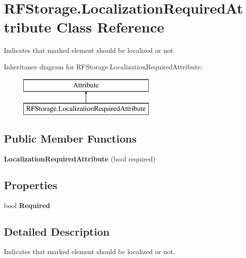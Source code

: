 \section{R\+F\+Storage.\+Localization\+Required\+Attribute Class Reference}
\label{class_r_f_storage_1_1_localization_required_attribute}


Indicates that marked element should be localized or not.  


Inheritance diagram for R\+F\+Storage.\+Localization\+Required\+Attribute\+:\begin{figure}[H]
\begin{center}
\leavevmode
\includegraphics[height=2.000000cm]{class_r_f_storage_1_1_localization_required_attribute}
\end{center}
\end{figure}
\subsection*{Public Member Functions}
\begin{DoxyCompactItemize}
\item 
\mbox{\label{class_r_f_storage_1_1_localization_required_attribute_ab5d889aa12df48310745f86a132b45fb}} 
{\bfseries Localization\+Required\+Attribute} (bool required)
\end{DoxyCompactItemize}
\subsection*{Properties}
\begin{DoxyCompactItemize}
\item 
\mbox{\label{class_r_f_storage_1_1_localization_required_attribute_aad1160151af5ec0bf170dfdd9c585f4c}} 
bool {\bfseries Required}\hspace{0.3cm}{\ttfamily  [get]}
\end{DoxyCompactItemize}


\subsection{Detailed Description}
Indicates that marked element should be localized or not. 


